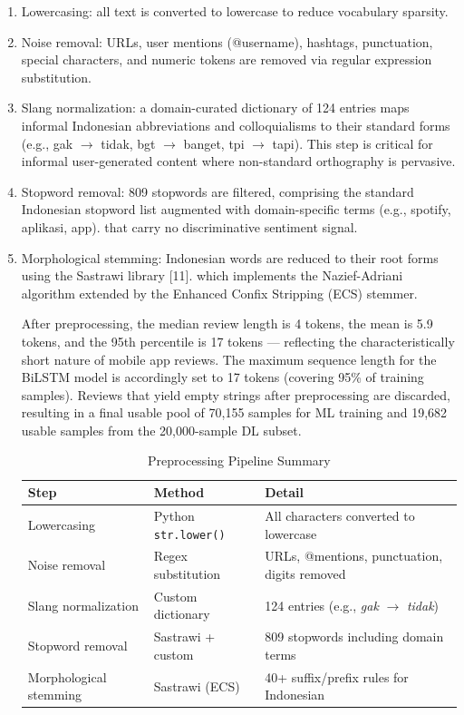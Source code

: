 \documentclass{article}
\begin{document}
\begin{enumerate}
    \item {Lowercasing:} all text is converted to lowercase to reduce vocabulary sparsity.
    \item {Noise removal:} URLs, user mentions (@username), hashtags, punctuation, special characters, and numeric tokens are removed via regular expression substitution.
    \item {Slang normalization:} a domain-curated dictionary of 124 entries maps informal Indonesian abbreviations and colloquialisms to their standard forms (e.g., gak $\rightarrow$ tidak, bgt $\rightarrow$ banget, tpi $\rightarrow$ tapi). This step is critical for informal user-generated content where non-standard orthography is pervasive.
    \item {Stopword removal:} 809 stopwords are filtered, comprising the standard Indonesian stopword list augmented with domain-specific terms (e.g., spotify, aplikasi, app). that carry no discriminative sentiment signal.
    \item {Morphological stemming:} Indonesian words are reduced to their root forms using the Sastrawi library [11]. which implements the Nazief-Adriani algorithm extended by the Enhanced Confix Stripping (ECS) stemmer.

After preprocessing, the median review length is 4 tokens, the mean is 5.9 tokens, and the 95th percentile is 17 tokens --- reflecting the characteristically short nature of mobile app reviews. The maximum sequence length for the BiLSTM model is accordingly set to 17 tokens (covering 95\% of training samples). Reviews that yield empty strings after preprocessing are discarded, resulting in a final usable pool of 70,155 samples for ML training and 19,682 usable samples from the 20,000-sample DL subset.

\begin{table}[H]
\centering
\caption{Preprocessing Pipeline Summary}
\label{tab:preprocessing}
\begin{tabular}{lll}
\toprule
\textbf{Step} & \textbf{Method} & \textbf{Detail} \\ \midrule
Lowercasing & Python \texttt{str.lower()} & All characters converted to lowercase \\
Noise removal & Regex substitution & URLs, @mentions, punctuation, digits removed \\
Slang normalization & Custom dictionary & 124 entries (e.g., \textit{gak} $\rightarrow$ \textit{tidak}) \\
Stopword removal & Sastrawi + custom & 809 stopwords including domain terms \\
Morphological stemming & Sastrawi (ECS) & 40+ suffix/prefix rules for Indonesian \\ \bottomrule
\end{tabular}
\end{table}

\end{enumerate}
\end{document}
